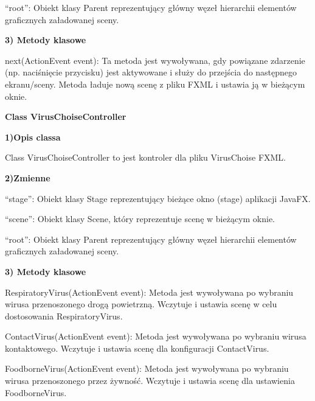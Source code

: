\documentclass[a4paper]{article}
\begin{document}
\foreignlanguage{polish}{“root”: Obiekt klasy Parent reprezentujący główny węzeł hierarchii elementów graficznych
załadowanej sceny.}


\bigskip

\foreignlanguage{polish}{\textbf{3) Metody klasowe}}

\foreignlanguage{polish}{next(ActionEvent event): Ta metoda jest wywoływana, gdy powiązane zdarzenie (np. naciśnięcie
przycisku) jest aktywowane i służy do przejścia do następnego ekranu/sceny. Metoda ładuje nową scenę z pliku FXML i
ustawia ją w bieżącym oknie.}




\bigskip


\bigskip

{\centering
\foreignlanguage{english}{\textbf{Class VirusChoiseController}}
\par}
\vspace{6pt}
\foreignlanguage{english}{\textbf{1)Opis classa}}

\foreignlanguage{english}{Class VirusChoiseController to jest kontroler dla pliku VirusChoise FXML.}


\bigskip

\foreignlanguage{polish}{\textbf{2)Zmienne}}

\foreignlanguage{polish}{“stage”: Obiekt klasy Stage reprezentujący bieżące okno (stage) aplikacji JavaFX.}

\foreignlanguage{polish}{“scene”: Obiekt klasy Scene, który reprezentuje scenę w bieżącym oknie.}

\foreignlanguage{polish}{“root”: Obiekt klasy Parent reprezentujący główny węzeł hierarchii elementów graficznych
załadowanej sceny.}


\bigskip

\foreignlanguage{polish}{\textbf{3) Metody klasowe}}

\foreignlanguage{polish}{RespiratoryVirus(ActionEvent event): Metoda jest wywoływana po wybraniu wirusa przenoszonego
drogą powietrzną. Wczytuje i ustawia scenę w celu dostosowania RespiratoryVirus.}

\foreignlanguage{polish}{ContactVirus(ActionEvent event): Metoda jest wywoływana po wybraniu wirusa kontaktowego.
Wczytuje i ustawia scenę dla konfiguracji ContactVirus.}

\foreignlanguage{polish}{FoodborneVirus(ActionEvent event): Metoda jest wywoływana po wybraniu wirusa przenoszonego
przez żywność. Wczytuje i ustawia scenę dla ustawienia FoodborneVirus.}
\end{document}
